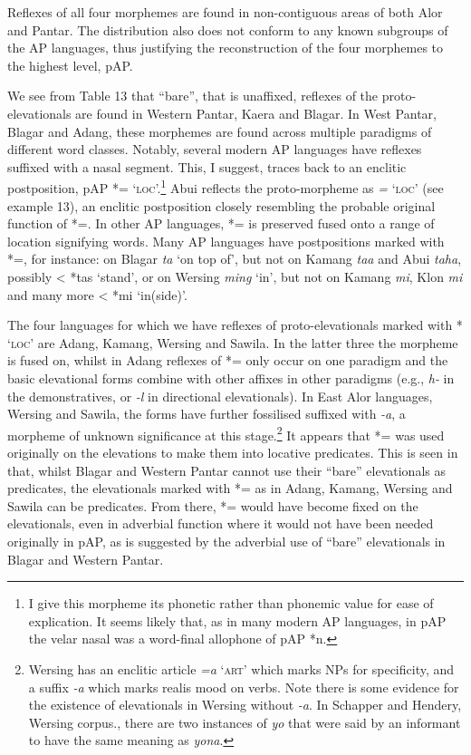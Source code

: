 \documentclass[output=paper]{LSP/langsci}
\begin{document}
Reflexes of all four morphemes are found in non-contiguous areas of both Alor and Pantar. The distribution also does not conform to any known subgroups of the AP languages, thus justifying the reconstruction of the four morphemes to the highest level, pAP.

 We see from Table 13 that ``bare'', that is unaffixed, reflexes of the proto-elevationals are found in Western Pantar, Kaera and Blagar. In West Pantar, Blagar and  Adang, these morphemes are found across multiple paradigms of different word classes. Notably, several modern AP languages have reflexes suffixed with a nasal segment. This, I suggest, traces back to an enclitic postposition, pAP *={\ng} `\textsc{loc}'.\footnote{{}  I give this morpheme its phonetic rather than phonemic value for ease of explication. It seems likely that, as in many modern AP languages, in pAP the velar nasal was a word-final allophone of pAP *n.}  Abui reflects the proto-morpheme as \textit{=}\textit{{\ng}} `\textsc{loc}' (see example 13), an enclitic postposition closely resembling the probable original function of *={\ng}. In other AP languages, *={\ng} is preserved fused onto a range of location signifying words. Many AP languages have postpositions marked with *={\ng}, for instance: on Blagar \textit{ta}\textit{{\ng}} `on top of', but not on Kamang \textit{taa} and Abui \textit{taha}, possibly {\textless} *tas `stand', or on Wersing \textit{ming} `in', but not on Kamang \textit{mi}, Klon \textit{mi} and many more {\textless} *mi `in(side)'. 

The four languages for which we have reflexes of proto-elevationals marked with *{\ng} `\textsc{loc}' are Adang, Kamang, Wersing and Sawila. In the latter three the morpheme is fused on, whilst in Adang reflexes of *={\ng} only occur on one paradigm and the basic elevational forms combine with other affixes in other paradigms (e.g., \textit{h}\textit{{\textepsilon}}\textit{{}-} in the demonstratives, or \textit{{}-l}\textit{{\textepsilon}} in directional elevationals). In East Alor languages, Wersing and Sawila, the forms have further fossilised suffixed with \textit{{}-a}, a morpheme of unknown significance at this stage.\footnote{{}  Wersing has an enclitic article \textit{=a} `\textsc{art}' which marks NPs for specificity, and a suffix \textit{{}-a} which marks realis mood on verbs. Note there is some evidence for the existence of elevationals in Wersing without \textit{{}-a}. In Schapper and Hendery, Wersing corpus., there are two instances of \textit{yo{\ng}} that were said by an informant to have the same meaning as \textit{yona}.} It appears that *={\ng} was used originally on the elevations to make them into locative predicates. This is seen in that, whilst Blagar and Western Pantar cannot use their ``bare'' elevationals as predicates, the elevationals marked with *={\ng} as in Adang, Kamang, Wersing and Sawila can be predicates. From there, *={\ng} would have become fixed on the elevationals, even in adverbial function where it would not have been needed originally in pAP, as is suggested by the adverbial use of ``bare'' elevationals in Blagar and Western Pantar.
\end{document}
